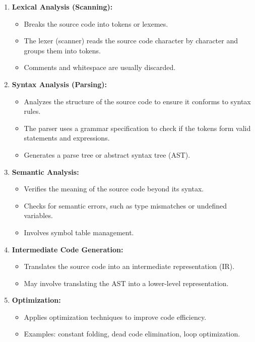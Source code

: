 \begin{enumerate}
    \item \textbf{Lexical Analysis (Scanning):}
    \begin{itemize}
        \item Breaks the source code into tokens or lexemes.
        \item The lexer (scanner) reads the source code character by character and groups them into tokens.
        \item Comments and whitespace are usually discarded.
    \end{itemize}
    \item \textbf{Syntax Analysis (Parsing):}
    \begin{itemize}
        \item Analyzes the structure of the source code to ensure it conforms to syntax rules.
        \item The parser uses a grammar specification to check if the tokens form valid statements and expressions.
        \item Generates a parse tree or abstract syntax tree (AST).
    \end{itemize}
    \item \textbf{Semantic Analysis:}
    \begin{itemize}
        \item Verifies the meaning of the source code beyond its syntax.
        \item Checks for semantic errors, such as type mismatches or undefined variables.
        \item Involves symbol table management.
    \end{itemize}
    \item \textbf{Intermediate Code Generation:}
    \begin{itemize}
        \item Translates the source code into an intermediate representation (IR).
        \item May involve translating the AST into a lower-level representation.
    \end{itemize}
    \item \textbf{Optimization:}
    \begin{itemize}
        \item Applies optimization techniques to improve code efficiency.
        \item Examples: constant folding, dead code elimination, loop optimization.
    \end{itemize}

\end{enumerate}
